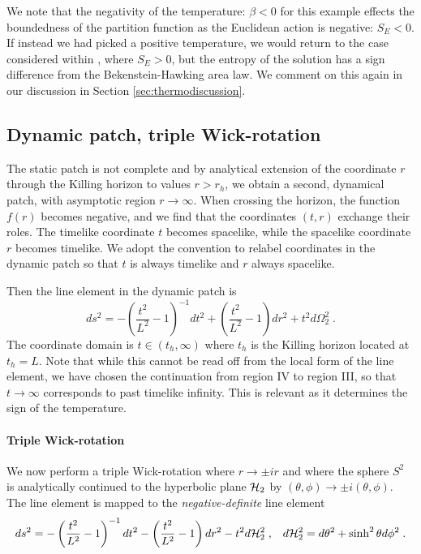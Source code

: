 We note that the negativity of the temperature: $\beta < 0$ for this example effects the boundedness of the partition function as the Euclidean action is negative: $S_E < 0$. If instead we had picked a positive temperature, we would return to the case considered within \cite{Gibbons:1977mu}, where $S_E > 0$, but the entropy of the solution has a sign difference from the Bekenstein-Hawking area law. We comment on this again in our discussion in Section \ref{sec:thermodiscussion}. 

\subsection{Dynamic patch, triple Wick-rotation}

The static patch is not complete and by analytical extension of the coordinate $r$ through the Killing horizon to values $r > r_h$, we obtain a second, dynamical patch, with asymptotic region $r \rightarrow \infty$. When crossing the horizon, the function $f(r)$ becomes negative, and we find that the coordinates $(t,r)$ exchange their roles. The timelike coordinate $t$ becomes spacelike, while the spacelike coordinate $r$ becomes timelike. We adopt the convention to relabel coordinates in the dynamic patch so that $t$ is always timelike and $r$ always spacelike. 

Then the line element in the dynamic patch is
\begin{equation}
\label{eq:desitterasy}
    ds^2 = -\left( \frac{t^2}{L^2} -1\right)^{-1} dt^2 +\left(\frac{t^2}{L^2} - 1\right) dr^2 + t^2 d\Omega^2_2\;.
\end{equation}
The coordinate domain is $t\in (t_h, \infty)$ where $t_h$ is the Killing horizon located at $t_h=L$. Note that while this cannot be read off from the local form of the line element, we have chosen the continuation from region IV to region III, so that $t \rightarrow \infty$ corresponds to past timelike infinity. This is relevant as it determines the sign of the temperature. 

\paragraph{Triple Wick-rotation}
We now perform a triple Wick-rotation where $r \rightarrow \pm i r$ and where the sphere $S^2$ is analytically continued to the hyperbolic plane ${\cal H}_2$ by $(\theta, \phi) \rightarrow \pm i (\theta, \phi)$. The line element  is mapped to the \emph{negative-definite} line element
\begin{equation*}
    ds^2 = -\left( \frac{t^2}{L^2} -1\right)^{-1} dt^2 -\left(\frac{t^2}{L^2} - 1\right) dr^2 - t^2 d{\cal H}^2_2\;,\;\;\;
    d{\cal H}^2_2 = d\theta^2 + \sinh^2 \theta d\phi^2 \;.
\end{equation*}

